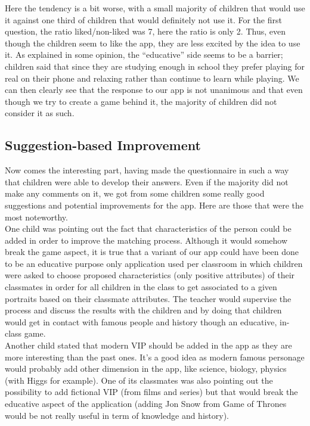 \documentclass[12pt]{scrartcl}
\begin{document}
			Here the tendency is a bit worse, with a small majority of children that would use it against one third of children that would definitely not use it. For the first question, the ratio liked/non-liked was 7, here the ratio is only 2. Thus, even though the children seem to like the app, they are less excited by the idea to use it. As explained in some opinion, the “educative” side seems to be a barrier; children said that since they are studying enough in school they prefer playing for real on their phone and relaxing rather than continue to learn while playing. We can then clearly see that the response to our app is not unanimous and that even though we try to create a game behind it, the majority of children did not consider it as such.

		
	\subsection{Suggestion-based Improvement}
	

		Now comes the interesting part, having made the questionnaire in such a way that children were able to develop their answers. Even if the majority did not make any comments on it, we got from some children some really good suggestions and potential improvements for the app. Here are those that were the most noteworthy.\\

		One child was pointing out the fact that characteristics of the person could be added in order to improve the matching process. Although it would somehow break the game aspect, it is true that a variant of our app could have been done to be an educative purpose only application used per classroom in which children were asked to choose proposed characteristics (only positive attributes) of their classmates in order for all children in the class to get associated to a given portraits based on their classmate attributes. The teacher would supervise the process and discuss the results with the children and by doing that children would get in contact with famous people and history though an educative, in-class game.\\
		
		Another child stated that modern VIP should be added in the app as they are more interesting than the past ones. It’s a good idea as modern famous personage would probably add other dimension in the app, like science, biology, physics (with Higgs for example). One of its classmates was also pointing out the possibility to add fictional VIP (from films and series) but that would break the educative aspect of the application (adding Jon Snow from Game of Thrones would be not really useful in term of knowledge and history).\\
		
\end{document}
